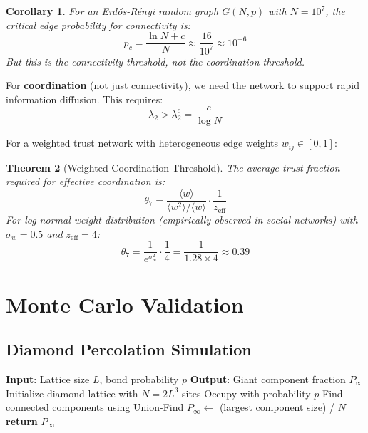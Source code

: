 \documentclass[11pt]{article}
\newtheorem{theorem}{Theorem}[section]
\newtheorem{corollary}[theorem]{Corollary}
\begin{document}
\begin{corollary}
For an Erdős-Rényi random graph $G(N, p)$ with $N = 10^7$, the critical edge probability for connectivity is:
\begin{equation}
p_c = \frac{\ln N + c}{N} \approx \frac{16}{10^7} \approx 10^{-6}
\end{equation}
But this is the connectivity threshold, not the coordination threshold.
\end{corollary}

For \textbf{coordination} (not just connectivity), we need the network to support rapid information diffusion. This requires:
\begin{equation}
\lambda_2 > \lambda_2^c = \frac{c}{\log N}
\end{equation}

For a weighted trust network with heterogeneous edge weights $w_{ij} \in [0,1]$:

\begin{theorem}[Weighted Coordination Threshold]
The average trust fraction required for effective coordination is:
\begin{equation}
\theta_7 = \frac{\langle w \rangle}{\langle w^2 \rangle / \langle w \rangle} \cdot \frac{1}{z_{\text{eff}}}
\end{equation}
For log-normal weight distribution (empirically observed in social networks) with $\sigma_w = 0.5$ and $z_{\text{eff}} = 4$:
\begin{equation}
\theta_7 = \frac{1}{e^{\sigma_w^2}} \cdot \frac{1}{4} = \frac{1}{1.28 \times 4} \approx 0.39
\end{equation}
\end{theorem}

\section{Monte Carlo Validation}
\label{sec:monte_carlo}

\subsection{Diamond Percolation Simulation}

\begin{algorithm}
\caption{Diamond Lattice Percolation}
\begin{algorithmic}
\STATE \textbf{Input}: Lattice size $L$, bond probability $p$
\STATE \textbf{Output}: Giant component fraction $P_\infty$
\STATE Initialize diamond lattice with $N = 2L^3$ sites
    \STATE Occupy with probability $p$
\ENDFOR
\STATE Find connected components using Union-Find
\STATE $P_\infty \leftarrow $ (largest component size) / $N$
\STATE \textbf{return} $P_\infty$
\end{algorithmic}
\end{algorithm}
\end{document}
